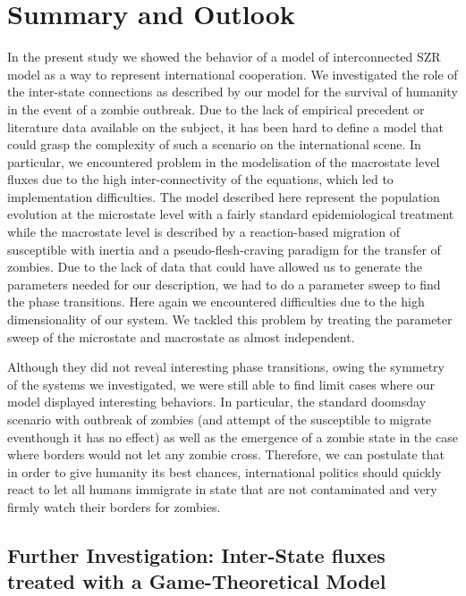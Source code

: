 \documentclass[11pt]{article} %
\begin{document}
\newpage
\section{Summary and Outlook}\indent

In the present study we showed the behavior of a model of interconnected SZR model as a way to represent international cooperation. We investigated the role of the inter-state connections as described by our model for the survival of humanity in the event of a zombie outbreak. Due to the lack of empirical precedent or literature data available on the subject, it has been hard to define a model that could grasp the complexity of such a scenario on the international scene. In particular, we encountered problem in the modelisation of the macrostate level fluxes due to the high inter-connectivity of the equations, which led to implementation difficulties. The model described here represent the population evolution at the microstate level with a fairly standard epidemiological treatment while the macrostate level is described by a reaction-based migration of susceptible with inertia and a pseudo-flesh-craving paradigm for the transfer of zombies. Due to the lack of data that could have allowed us to generate the parameters needed for our description, we had to do a parameter sweep to find the phase transitions. Here again we encountered difficulties due to the high dimensionality of our system. We tackled this problem by treating the parameter sweep of the microstate and macrostate as almost independent. 

Although they did not reveal interesting phase transitions, owing the symmetry of the systems we investigated, we were still able to find limit cases where our model displayed interesting behaviors. In particular, the standard doomsday scenario with outbreak of zombies (and attempt of the susceptible to migrate eventhough it has no effect) as well as the emergence of a zombie state in the case where borders would not let any zombie cross. Therefore, we can postulate that in order to give humanity its best chances, international politics should quickly react to let all humans immigrate in state that are not contaminated and very firmly watch their borders for zombies.
  


\subsection{Further Investigation: Inter-State fluxes treated with a Game-Theoretical Model}\indent
\label{sec:gt}
\end{document}
